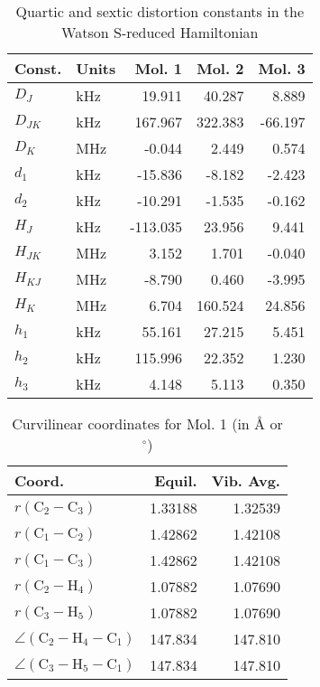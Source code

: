 \begin{table}
\centering
\caption{Quartic and sextic distortion constants in the Watson S-reduced Hamiltonian}
\begin{tabular}{llrrr}
Const.        & Units    &     Mol. 1 &     Mol. 2 &     Mol. 3 \\
\hline
$D_{J}$       & kHz      &     19.911 &     40.287 &      8.889 \\
$D_{JK}$      & kHz      &    167.967 &    322.383 &    -66.197 \\
$D_{K}$       & MHz      &     -0.044 &      2.449 &      0.574 \\
$d_{1}$       & kHz      &    -15.836 &     -8.182 &     -2.423 \\
$d_{2}$       & kHz      &    -10.291 &     -1.535 &     -0.162 \\
\hline
$H_{J}$       & kHz      &   -113.035 &     23.956 &      9.441 \\
$H_{JK}$      & MHz      &      3.152 &      1.701 &     -0.040 \\
$H_{KJ}$      & MHz      &     -8.790 &      0.460 &     -3.995 \\
$H_{K}$       & MHz      &      6.704 &    160.524 &     24.856 \\
$h_{1}$       & kHz      &     55.161 &     27.215 &      5.451 \\
$h_{2}$       & kHz      &    115.996 &     22.352 &      1.230 \\
$h_{3}$       & kHz      &      4.148 &      5.113 &      0.350 \\
\end{tabular}
\end{table}

\begin{table}
\centering
\caption{Curvilinear coordinates for Mol. 1 (in \AA{} or $^\circ$)}
\begin{tabular}{lrr}
       Coord.         &             Equil. &          Vib. Avg. \\
\hline
$r(\text{C}_{2} - \text{C}_{3})$ &            1.33188 &            1.32539 \\
$r(\text{C}_{1} - \text{C}_{2})$ &            1.42862 &            1.42108 \\
$r(\text{C}_{1} - \text{C}_{3})$ &            1.42862 &            1.42108 \\
$r(\text{C}_{2} - \text{H}_{4})$ &            1.07882 &            1.07690 \\
$r(\text{C}_{3} - \text{H}_{5})$ &            1.07882 &            1.07690 \\
$\angle(\text{C}_{2} - \text{H}_{4} - \text{C}_{1})$ &            147.834 &            147.810 \\
$\angle(\text{C}_{3} - \text{H}_{5} - \text{C}_{1})$ &            147.834 &            147.810 \\
\end{tabular}
\end{table}

